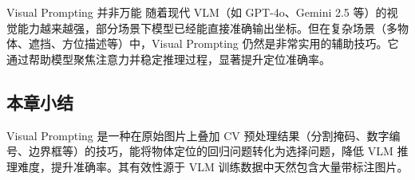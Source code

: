 \begin{warningbox}{Visual Prompting 并非万能}
随着现代 VLM（如 GPT-4o、Gemini 2.5 等）的视觉能力越来越强，部分场景下模型已经能直接准确输出坐标。但在复杂场景（多物体、遮挡、方位描述等）中，Visual Prompting 仍然是非常实用的辅助技巧。它通过帮助模型聚焦注意力并稳定推理过程，显著提升定位准确率。
\end{warningbox}

\subsection{本章小结}

Visual Prompting 是一种在原始图片上叠加 CV 预处理结果（分割掩码、数字编号、边界框等）的技巧，能将物体定位的回归问题转化为选择问题，降低 VLM 推理难度，提升准确率。其有效性源于 VLM 训练数据中天然包含大量带标注图片。


